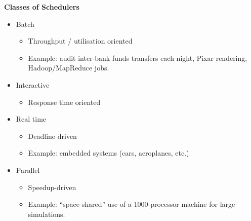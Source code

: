 \documentclass[11pt,a4paper]{article}
\begin{document}
\textbf{Classes of Schedulers}
\begin{itemize}
    \item Batch
        \begin{itemize}
            \item Throughput / utilisation oriented
            \item Example: audit inter-bank funds transfers each night, Pixar rendering,
                Hadoop/MapReduce jobs.
        \end{itemize}
    \item Interactive
        \begin{itemize}
            \item Response time oriented
        \end{itemize}
    \item Real time
        \begin{itemize}
            \item Deadline driven
            \item Example: embedded systems (cars, aeroplanes, etc.)
        \end{itemize}
    \item Parallel
        \begin{itemize}
            \item Speedup-driven
            \item Example: ``space-shared'' use of a 1000-processor machine for large
                simulations.
        \end{itemize}
\end{itemize}
\end{document}
